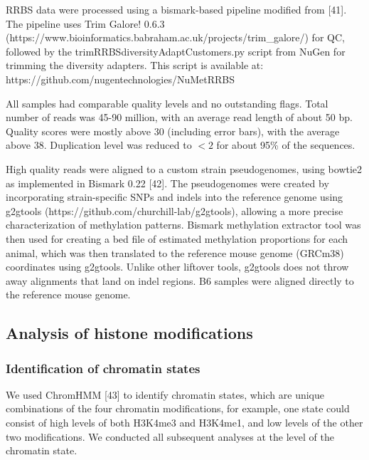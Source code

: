 \documentclass[10pt,letterpaper]{article}
\begin{document}
RRBS data were processed using a bismark-based pipeline modified from
{[}41{]}. The pipeline uses Trim Galore! 0.6.3
(https://www.bioinformatics.babraham.ac.uk/projects/trim\_galore/) for
QC, followed by the trimRRBSdiversityAdaptCustomers.py script from NuGen
for trimming the diversity adapters. This script is available at:
https://github.com/nugentechnologies/NuMetRRBS

All samples had comparable quality levels and no outstanding flags.
Total number of reads was 45-90 million, with an average read length of
about 50 bp. Quality scores were mostly above 30 (including error bars),
with the average above 38. Duplication level was reduced to \(<2\) for
about 95\% of the sequences.

High quality reads were aligned to a custom strain pseudogenomes, using
bowtie2 as implemented in Bismark 0.22 {[}42{]}. The pseudogenomes were
created by incorporating strain-specific SNPs and indels into the
reference genome using g2gtools
(https://github.com/churchill-lab/g2gtools), allowing a more precise
characterization of methylation patterns. Bismark methylation extractor
tool was then used for creating a bed file of estimated methylation
proportions for each animal, which was then translated to the reference
mouse genome (GRCm38) coordinates using g2gtools. Unlike other liftover
tools, g2gtools does not throw away alignments that land on indel
regions. B6 samples were aligned directly to the reference mouse genome.

\hypertarget{analysis-of-histone-modifications}{%
\subsection{Analysis of histone
modifications}\label{analysis-of-histone-modifications}}

\hypertarget{identification-of-chromatin-states}{%
\subsubsection{Identification of chromatin
states}\label{identification-of-chromatin-states}}

We used ChromHMM {[}43{]} to identify chromatin states, which are unique
combinations of the four chromatin modifications, for example, one state
could consist of high levels of both H3K4me3 and H3K4me1, and low levels
of the other two modifications. We conducted all subsequent analyses at
the level of the chromatin state.
\end{document}
